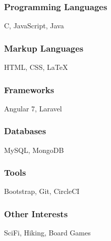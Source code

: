 \documentclass[12pt]{res} %
\begin{document}
\begin{resume}
          \begin{multicols}{3}

            \subsubsection{Programming Languages}
            \vspace{-22pt}
            C, JavaScript, Java
            \vspace{-28pt}

            \subsubsection{Markup Languages}
            \vspace{-22pt}
            HTML, CSS, \LaTeX
            \vspace{-28pt}

            \subsubsection{Frameworks}
            \vspace{-22pt}
            Angular 7, Laravel
            \vspace{-28pt}

            \subsubsection{Databases}
            \vspace{-22pt}
            MySQL, MongoDB
            \vspace{-28pt}

            \subsubsection{Tools}
            \vspace{-22pt}
            Bootstrap, Git, CircleCI
            \vspace{-28pt}

            \subsubsection{Other Interests}
            \vspace{-22pt}
            SciFi, Hiking, Board Games

            \vspace{-12pt}


\end{multicols}
\end{resume}
\end{document}
